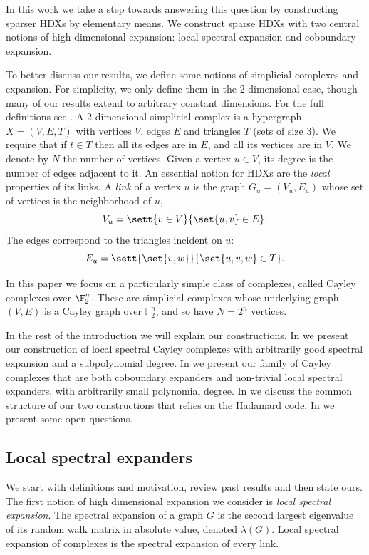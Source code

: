 In this work we take a step towards answering this question by constructing sparser HDXs by elementary means. We construct sparse HDXs with two central notions of high dimensional expansion: local spectral expansion and coboundary expansion.

To better discuss our results, we define some notions of simplicial complexes and expansion. For simplicity, we only define them in the \(2\)-dimensional case, though many of our results extend to arbitrary constant dimensions. For the full definitions see . A 2-dimensional simplicial complex is a hypergraph \(X=(V,E,T)\) with vertices \(V\), edges \(E\) and triangles \(T\) (sets of size \(3\)). We require that if \(t \in T\) then all its edges are in \(E\), and all its vertices are in \(V\). We denote by \(N\) the number of vertices. Given a vertex \(u \in V\), its degree is the number of edges adjacent to it.  An essential notion for HDXs are the \emph{local} properties of its links. A \emph{link} of a vertex \(u\) is the graph \(G_u=(V_u,E_u)\) whose set of vertices is the neighborhood of \(u\), 
\[V_u = \sett{v \in V}{\set{u,v} \in E}.\]
The edges correspond to the triangles incident on \(u\):
\[E_u = \sett{\set{v,w}}{\set{u,v,w} \in T}.\]

In this paper we focus on a particularly simple class of complexes, called Cayley complexes over \(\F_2^n\). These are simplicial complexes whose underlying graph \((V,E)\) is a Cayley graph over \(\mathbb{F}_2^n\), and so have \(N=2^n\) vertices. 

In the rest of the introduction we will explain our constructions. In  we present our construction of local spectral Cayley complexes with arbitrarily good spectral expansion and a subpolynomial degree. In  we present our family of Cayley complexes that are both coboundary expanders and non-trivial local spectral expanders, with arbitrarily small polynomial degree. In  we discuss the common structure of our two constructions that relies on the Hadamard code. In  we present some open questions.


\subsection{Local spectral expanders} \label{sec:intro-spec-exp}
%
We start with definitions and motivation, review past results and then state ours. The first notion of high dimensional expansion we consider is \emph{local spectral expansion}. The spectral expansion of a graph \(G\) is the second largest eigenvalue of its random walk matrix in absolute value, denoted \(\lambda(G)\). Local spectral expansion of complexes is the spectral expansion of every link.

